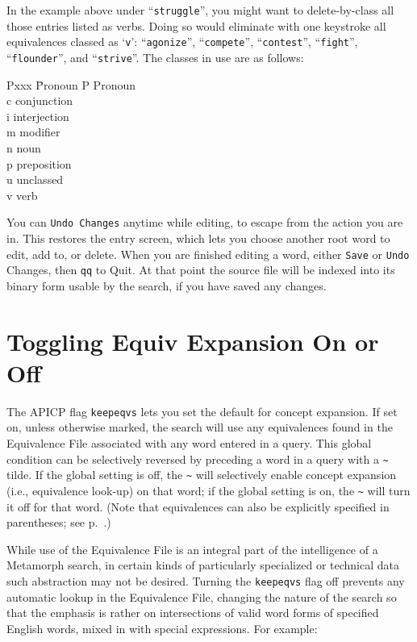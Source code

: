 In the example above under ``\verb`struggle`'', you might want to
delete-by-class all those entries listed as verbs.  Doing so would
eliminate with one keystroke all equivalences classed as `\verb`v`':
``\verb`agonize`'', ``\verb`compete`'', ``\verb`contest`'',
``\verb`fight`'', ``\verb`flounder`'', and ``\verb`strive`''.  The
classes in use are as follows:

\begin{tabbing}
Pxxx \= Pronoun         \kill
   P \> Pronoun         \\
   c \> conjunction     \\
   i \> interjection    \\
   m \> modifier        \\
   n \> noun            \\
   p \> preposition     \\
   u \> unclassed       \\
   v \> verb
\end{tabbing}

You can \verb`Undo Changes` anytime while editing, to escape from the
action you are in.  This restores the entry screen, which lets you
choose another root word to edit, add to, or delete.  When you are
finished editing a word, either \verb`Save` or \verb`Undo` Changes,
then \verb`qq` to Quit.  At that point the source file will be indexed
into its binary form usable by the search, if you have saved any
changes.

\section{Toggling Equiv Expansion On or Off}

The APICP flag \verb`keepeqvs` lets you set the default for concept
expansion.  If set on, unless otherwise marked, the search will use
any equivalences found in the Equivalence File associated with any
word entered in a query.  This global condition can be selectively
reversed by preceding a word in a query with a \verb`~` tilde.  If the
global setting is off, the \verb`~` will selectively enable
concept expansion (i.e., equivalence look-up) on that word; if
the global setting is on, the \verb`~` will turn it off for that word.
(Note that equivalences can also be explicitly specified in
parentheses; see p.~\pageref{`MetamorphParenSet'}.)

While use of the Equivalence File is an integral part of the
intelligence of a Metamorph search, in certain kinds of particularly
specialized or technical data such abstraction may not be desired.
Turning the \verb`keepeqvs` flag off prevents any automatic lookup in the
Equivalence File, changing the nature of the search so that the
emphasis is rather on intersections of valid word forms of specified
English words, mixed in with special expressions. For example:

